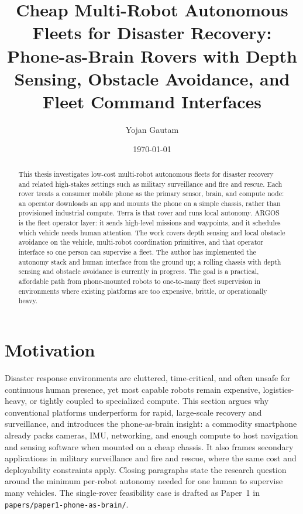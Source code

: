 \documentclass[11pt,a4paper]{article}
\title{Cheap Multi-Robot Autonomous Fleets for Disaster Recovery:\\
Phone-as-Brain Rovers with Depth Sensing, Obstacle Avoidance, and Fleet Command Interfaces}
\author{Yojan Gautam}
\date{\today}
\begin{document}
\maketitle

\begin{abstract}
This thesis investigates low-cost multi-robot autonomous fleets for disaster recovery and related high-stakes settings such as military surveillance and fire and rescue.
Each rover treats a consumer mobile phone as the primary sensor, brain, and compute node: an operator downloads an app and mounts the phone on a simple chassis, rather than provisioned industrial compute.
Terra is that rover and runs local autonomy. ARGOS is the fleet operator layer: it sends high-level missions and waypoints, and it schedules which vehicle needs human attention.
The work covers depth sensing and local obstacle avoidance on the vehicle, multi-robot coordination primitives, and that operator interface so one person can supervise a fleet.
The author has implemented the autonomy stack and human interface from the ground up; a rolling chassis with depth sensing and obstacle avoidance is currently in progress.
The goal is a practical, affordable path from phone-mounted robots to one-to-many fleet supervision in environments where existing platforms are too expensive, brittle, or operationally heavy.
\end{abstract}

\tableofcontents
\newpage

\section{Motivation}
\label{sec:motivation}
Disaster response environments are cluttered, time-critical, and often unsafe for continuous human presence, yet most capable robots remain expensive, logistics-heavy, or tightly coupled to specialized compute.
This section argues why conventional platforms underperform for rapid, large-scale recovery and surveillance, and introduces the phone-as-brain insight: a commodity smartphone already packs cameras, IMU, networking, and enough compute to host navigation and sensing software when mounted on a cheap chassis.
It also frames secondary applications in military surveillance and fire and rescue, where the same cost and deployability constraints apply.
Closing paragraphs state the research question around the minimum per-robot autonomy needed for one human to supervise many vehicles.
The single-rover feasibility case is drafted as Paper~1 in \texttt{papers/paper1-phone-as-brain/}.
\end{document}
